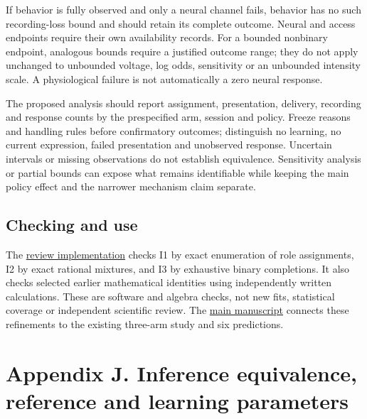 \documentclass[
  american,
  11pt,
  letterpaper,
]{article}
\begin{document}
If behavior is fully observed and only a neural channel fails, behavior has no such recording-loss bound and should retain its complete outcome. Neural and access endpoints require their own availability records. For a bounded nonbinary endpoint, analogous bounds require a justified outcome range; they do not apply unchanged to unbounded voltage, log odds, sensitivity or an unbounded intensity scale. A physiological failure is not automatically a zero neural response.

The proposed analysis should report assignment, presentation, delivery, recording and response counts by the prespecified arm, session and policy. Freeze reasons and handling rules before confirmatory outcomes; distinguish no learning, no current expression, failed presentation and unobserved response. Uncertain intervals or missing observations do not establish equivalence. Sensitivity analysis or partial bounds can expose what remains identifiable while keeping the main policy effect and the narrower mechanism claim separate.

\enlargethispage{2\baselineskip}

\subsection{Checking and use}\label{checking-and-use}

The \href{https://github.com/v5ma/v5ma.github.io/blob/master/papers/companions/learning-to-feel-v1.0/ARTIFACT-AVAILABILITY.md#artifact-32}{review implementation} checks I1 by exact enumeration of role assignments, I2 by exact rational mixtures, and I3 by exhaustive binary completions. It also checks selected earlier mathematical identities using independently written calculations. These are software and algebra checks, not new fits, statistical coverage or independent scientific review. The \href{https://raw.githubusercontent.com/v5ma/v5ma.github.io/master/papers/companions/learning-to-feel-v1.0/Learning-to-Feel-v1.0.pdf}{main manuscript} connects these refinements to the existing three-arm study and six predictions.

\clearpage
\hypertarget{appendix-j}{}

\section{Appendix J. Inference equivalence, reference and learning parameters}\label{appendix-j.-inference-equivalence-reference-and-learning-parameters}
\end{document}
